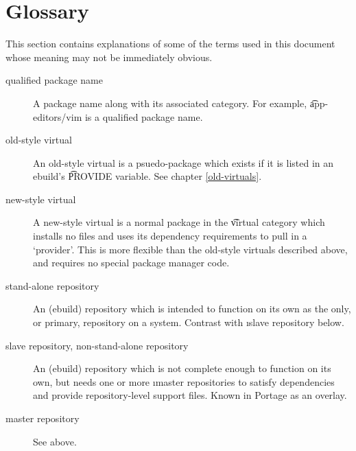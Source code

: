 \chapter{Glossary}
\label{glossary}

This section contains explanations of some of the terms used in this document whose meaning may not
be immediately obvious.

\begin{description}
\item[qualified package name] A package name along with its associated category. For example,
    \t{app-editors/vim} is a qualified package name.
\item[old-style virtual] An old-style virtual is a psuedo-package which exists if it is listed in an
    ebuild's \t{PROVIDE} variable. See chapter \ref{old-virtuals}.
\item[new-style virtual] A new-style virtual is a normal package in the \t{virtual} category which
    installs no files and uses its dependency requirements to pull in a `provider'. This is more
    flexible than the old-style virtuals described above, and requires no special package manager
    code.
\item[stand-alone repository] An (ebuild) repository which is intended to function on its own as the
    only, or primary, repository on a system. Contrast with \i{slave repository} below.
\item[slave repository, non-stand-alone repository] An (ebuild) repository which is not complete
    enough to function on its own, but needs one or more \i{master repositories} to
    satisfy dependencies and provide repository-level support files. Known in Portage as an overlay.
\item[master repository] See above.

\end{description}



